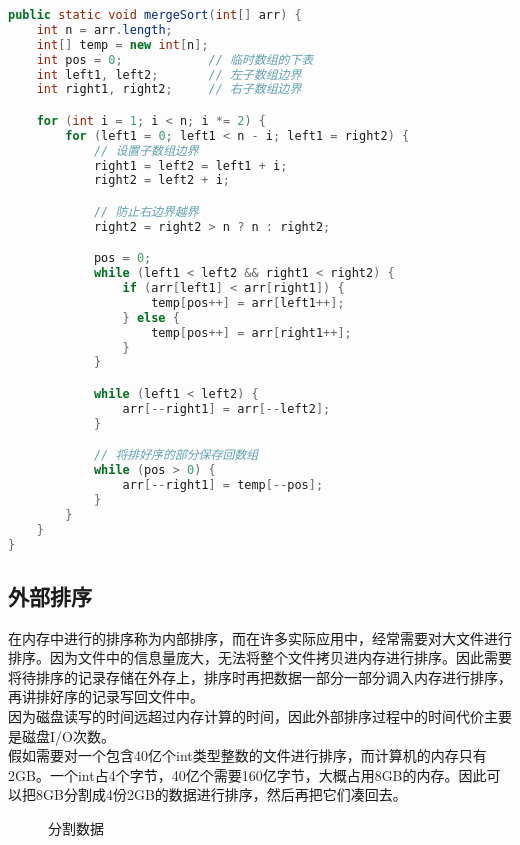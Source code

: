 \begin{lstlisting}[language=Java]
public static void mergeSort(int[] arr) {
    int n = arr.length;
    int[] temp = new int[n];
    int pos = 0;            // 临时数组的下表
    int left1, left2;       // 左子数组边界
    int right1, right2;     // 右子数组边界

    for (int i = 1; i < n; i *= 2) {
        for (left1 = 0; left1 < n - i; left1 = right2) {
            // 设置子数组边界
            right1 = left2 = left1 + i;
            right2 = left2 + i;

            // 防止右边界越界
            right2 = right2 > n ? n : right2;

            pos = 0;
            while (left1 < left2 && right1 < right2) {
                if (arr[left1] < arr[right1]) {
                    temp[pos++] = arr[left1++];
                } else {
                    temp[pos++] = arr[right1++];
                }
            }

            while (left1 < left2) {
                arr[--right1] = arr[--left2];
            }

            // 将排好序的部分保存回数组
            while (pos > 0) {
                arr[--right1] = temp[--pos];
            }
        }
    }
}
\end{lstlisting}

\subsection{外部排序}

在内存中进行的排序称为内部排序，而在许多实际应用中，经常需要对大文件进行排序。因为文件中的信息量庞大，无法将整个文件拷贝进内存进行排序。因此需要将待排序的记录存储在外存上，排序时再把数据一部分一部分调入内存进行排序，再讲排好序的记录写回文件中。 \\

因为磁盘读写的时间远超过内存计算的时间，因此外部排序过程中的时间代价主要是磁盘I/O次数。 \\

假如需要对一个包含40亿个int类型整数的文件进行排序，而计算机的内存只有2GB。一个int占4个字节，40亿个需要160亿字节，大概占用8GB的内存。因此可以把8GB分割成4份2GB的数据进行排序，然后再把它们凑回去。 \\

\begin{figure}[H]
    \centering
    \caption{分割数据}
\end{figure}

